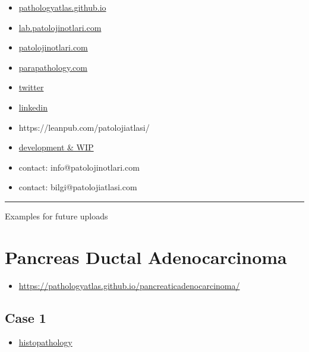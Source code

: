 \documentclass[
  letterpaper,
  DIV=11,
  numbers=noendperiod]{scrreprt}
\providecommand{\tightlist}{%
  \setlength{\itemsep}{0pt}\setlength{\parskip}{0pt}}
\begin{document}
\begin{itemize}
\item
  \href{https://pathologyatlas.github.io/}{pathologyatlas.github.io}
\item
  \href{https://lab.patolojinotlari.com}{lab.patolojinotlari.com}
\item
  \href{https://patolojinotlari.com}{patolojinotlari.com}
\item
  \href{https://parapathology.com}{parapathology.com}
\item
  \href{https://twitter.com/patolojinotlari}{twitter}
\item
  \href{https://www.linkedin.com/company/patoloji-notlari}{linkedin}
\item
  https://leanpub.com/patolojiatlasi/
\item
  \href{https://pathologyatlas.github.io/development.md}{development \&
  WIP}
\item
  contact: info@patolojinotlari.com
\item
  contact: bilgi@patolojiatlasi.com
\end{itemize}

\begin{center}\rule{0.5\linewidth}{0.5pt}\end{center}

Examples for future uploads

\hypertarget{pancreas-ductal-adenocarcinoma}{%
\chapter{Pancreas Ductal
Adenocarcinoma}\label{pancreas-ductal-adenocarcinoma}}

\begin{itemize}
\tightlist
\item
  \url{https://pathologyatlas.github.io/pancreaticadenocarcinoma/}
\end{itemize}

\hypertarget{case-1}{%
\section{Case 1}\label{case-1}}

\begin{itemize}
\tightlist
\item
  \href{https://pathologyatlas.github.io/pancreaticadenocarcinoma/case1-histopathology/viewer_z0.html}{histopathology}
\end{itemize}
\end{document}
